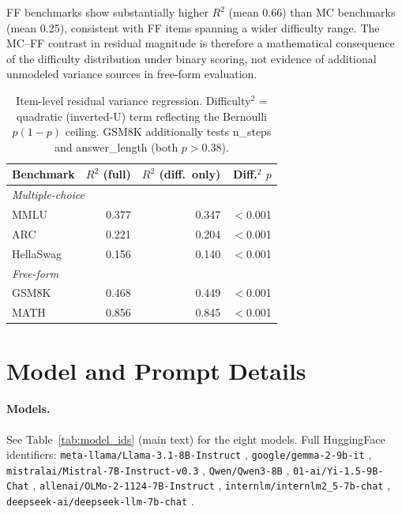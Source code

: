 FF benchmarks show substantially higher $R^2$ (mean 0.66) than MC benchmarks (mean 0.25), consistent with FF items spanning a wider difficulty range. The MC--FF contrast in residual magnitude is therefore a mathematical consequence of the difficulty distribution under binary scoring, not evidence of additional unmodeled variance sources in free-form evaluation.

\begin{table}[h]
\centering
\caption{Item-level residual variance regression. Difficulty$^2$ = quadratic (inverted-U) term reflecting the Bernoulli $p(1{-}p)$ ceiling. GSM8K additionally tests n\_steps and answer\_length (both $p > 0.38$).}
\label{tab:ff_residual}
\scriptsize
\begin{tabular}{lrrr}
\toprule
Benchmark & $R^2$ (full) & $R^2$ (diff.\ only) & Diff.$^2$ $p$ \\
\midrule
\multicolumn{4}{l}{\textit{Multiple-choice}} \\
MMLU & 0.377 & 0.347 & $<$0.001 \\
ARC & 0.221 & 0.204 & $<$0.001 \\
HellaSwag & 0.156 & 0.140 & $<$0.001 \\
\midrule
\multicolumn{4}{l}{\textit{Free-form}} \\
GSM8K & 0.468 & 0.449 & $<$0.001 \\
MATH & 0.856 & 0.845 & $<$0.001 \\
\bottomrule
\end{tabular}
\end{table}

\section{Model and Prompt Details}
\label{app:models}

\paragraph{Models.} See Table~\ref{tab:model_ids} (main text) for the eight models. Full HuggingFace identifiers: \texttt{meta-llama/Llama-3.1-8B-Instruct} \cite{grattafiori2024llama3}, \texttt{google/gemma-2-9b-it} \cite{riviere2024gemma2}, \texttt{mistralai/Mistral-7B-Instruct-v0.3} \cite{jiang2023mistral}, \texttt{Qwen/Qwen3-8B} \cite{yang2025qwen3}, \texttt{01-ai/Yi-1.5-9B-Chat} \cite{young2024yi}, \texttt{allenai/OLMo-2-1124-7B-Instruct} \cite{olmo2025olmo2}, \texttt{internlm/internlm2\_5-7b-chat} \cite{cai2024internlm2}, \texttt{deepseek-ai/deepseek-llm-7b-chat} \cite{bi2024deepseek}.

